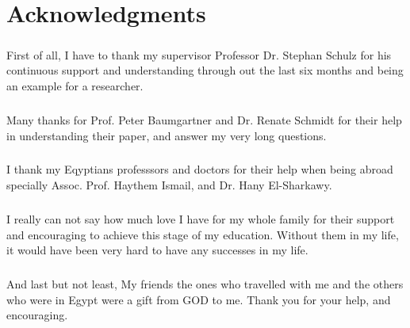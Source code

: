 \chapter*{Acknowledgments}
\label{chap:ack}


\paragraph{}
First of all, I have to thank my supervisor Professor Dr. Stephan Schulz for his continuous support and understanding through out the last six months and being an example for a researcher.

\paragraph{}
Many thanks for Prof. Peter Baumgartner and Dr. Renate Schmidt for their help in understanding their paper, and answer my very long questions.

\paragraph{}
I thank my Eqyptians professsors and doctors for their help when being abroad specially Assoc. Prof. Haythem Ismail, and Dr. Hany El-Sharkawy. 

\paragraph{}
I really can not say how much love I have for my whole family for their support and encouraging to achieve this stage of my education. Without them in my life, it would have been very hard to have any successes in my life.

\paragraph{}
And last but not least, My friends the ones who travelled with me and the others who were in Egypt were a gift from GOD to me. Thank you for your help, and encouraging. 
